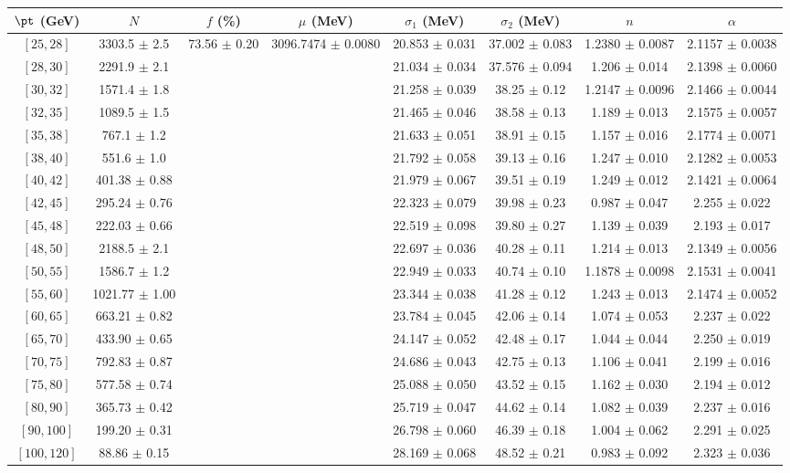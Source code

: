 \begin{tabular}{c||c|c|c|c|c|c|c}
$\pt$ (GeV) & $N$ & $f$ (\%) & $\mu$ (MeV) & $\sigma_1$ (MeV) & $\sigma_2$ (MeV) & $n$ & $\alpha$ \\
\hline
$[25, 28]$ & 3303.5 $\pm$ 2.5 & \multirow{19}{*}{73.56 $\pm$ 0.20} & \multirow{19}{*}{3096.7474 $\pm$ 0.0080} & 20.853 $\pm$ 0.031 & 37.002 $\pm$ 0.083 & 1.2380 $\pm$ 0.0087 & 2.1157 $\pm$ 0.0038\\
$[28, 30]$ & 2291.9 $\pm$ 2.1 &  &  & 21.034 $\pm$ 0.034 & 37.576 $\pm$ 0.094 & 1.206 $\pm$ 0.014 & 2.1398 $\pm$ 0.0060\\
$[30, 32]$ & 1571.4 $\pm$ 1.8 &  &  & 21.258 $\pm$ 0.039 & 38.25 $\pm$ 0.12 & 1.2147 $\pm$ 0.0096 & 2.1466 $\pm$ 0.0044\\
$[32, 35]$ & 1089.5 $\pm$ 1.5 &  &  & 21.465 $\pm$ 0.046 & 38.58 $\pm$ 0.13 & 1.189 $\pm$ 0.013 & 2.1575 $\pm$ 0.0057\\
$[35, 38]$ & 767.1 $\pm$ 1.2 &  &  & 21.633 $\pm$ 0.051 & 38.91 $\pm$ 0.15 & 1.157 $\pm$ 0.016 & 2.1774 $\pm$ 0.0071\\
$[38, 40]$ & 551.6 $\pm$ 1.0 &  &  & 21.792 $\pm$ 0.058 & 39.13 $\pm$ 0.16 & 1.247 $\pm$ 0.010 & 2.1282 $\pm$ 0.0053\\
$[40, 42]$ & 401.38 $\pm$ 0.88 &  &  & 21.979 $\pm$ 0.067 & 39.51 $\pm$ 0.19 & 1.249 $\pm$ 0.012 & 2.1421 $\pm$ 0.0064\\
$[42, 45]$ & 295.24 $\pm$ 0.76 &  &  & 22.323 $\pm$ 0.079 & 39.98 $\pm$ 0.23 & 0.987 $\pm$ 0.047 & 2.255 $\pm$ 0.022\\
$[45, 48]$ & 222.03 $\pm$ 0.66 &  &  & 22.519 $\pm$ 0.098 & 39.80 $\pm$ 0.27 & 1.139 $\pm$ 0.039 & 2.193 $\pm$ 0.017\\
$[48, 50]$ & 2188.5 $\pm$ 2.1 &  &  & 22.697 $\pm$ 0.036 & 40.28 $\pm$ 0.11 & 1.214 $\pm$ 0.013 & 2.1349 $\pm$ 0.0056\\
$[50, 55]$ & 1586.7 $\pm$ 1.2 &  &  & 22.949 $\pm$ 0.033 & 40.74 $\pm$ 0.10 & 1.1878 $\pm$ 0.0098 & 2.1531 $\pm$ 0.0041\\
$[55, 60]$ & 1021.77 $\pm$ 1.00 &  &  & 23.344 $\pm$ 0.038 & 41.28 $\pm$ 0.12 & 1.243 $\pm$ 0.013 & 2.1474 $\pm$ 0.0052\\
$[60, 65]$ & 663.21 $\pm$ 0.82 &  &  & 23.784 $\pm$ 0.045 & 42.06 $\pm$ 0.14 & 1.074 $\pm$ 0.053 & 2.237 $\pm$ 0.022\\
$[65, 70]$ & 433.90 $\pm$ 0.65 &  &  & 24.147 $\pm$ 0.052 & 42.48 $\pm$ 0.17 & 1.044 $\pm$ 0.044 & 2.250 $\pm$ 0.019\\
$[70, 75]$ & 792.83 $\pm$ 0.87 &  &  & 24.686 $\pm$ 0.043 & 42.75 $\pm$ 0.13 & 1.106 $\pm$ 0.041 & 2.199 $\pm$ 0.016\\
$[75, 80]$ & 577.58 $\pm$ 0.74 &  &  & 25.088 $\pm$ 0.050 & 43.52 $\pm$ 0.15 & 1.162 $\pm$ 0.030 & 2.194 $\pm$ 0.012\\
$[80, 90]$ & 365.73 $\pm$ 0.42 &  &  & 25.719 $\pm$ 0.047 & 44.62 $\pm$ 0.14 & 1.082 $\pm$ 0.039 & 2.237 $\pm$ 0.016\\
$[90, 100]$ & 199.20 $\pm$ 0.31 &  &  & 26.798 $\pm$ 0.060 & 46.39 $\pm$ 0.18 & 1.004 $\pm$ 0.062 & 2.291 $\pm$ 0.025\\
$[100, 120]$ & 88.86 $\pm$ 0.15 &  &  & 28.169 $\pm$ 0.068 & 48.52 $\pm$ 0.21 & 0.983 $\pm$ 0.092 & 2.323 $\pm$ 0.036\\
\end{tabular}
